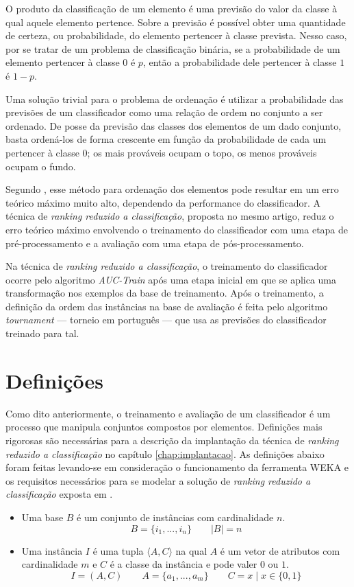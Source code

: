 O produto da classificação de um elemento é uma previsão do valor da classe à qual aquele elemento pertence. Sobre a previsão é possível obter uma quantidade de certeza, ou probabilidade, do elemento pertencer à classe prevista. Nesso caso, por se tratar de um problema de classificação binária, se a probabilidade de um elemento pertencer à classe $0$ é $p$, então a probabilidade dele pertencer à classe $1$ é $1 - p$.

Uma solução trivial para o problema de ordenação é utilizar a probabilidade das previsões de um classificador como uma relação de ordem no conjunto a ser ordenado. De posse da previsão das classes dos elementos de um dado conjunto, basta ordená-los de forma crescente em função da probabilidade de cada um pertencer à classe $0$; os mais prováveis ocupam o topo, os menos prováveis ocupam o fundo.

Segundo \cite{langford08}, esse método para ordenação dos elementos pode resultar em um erro teórico máximo muito alto, dependendo da performance do classificador. A técnica de \emph{ranking reduzido a classificação}, proposta no mesmo artigo, reduz o erro teórico máximo envolvendo o treinamento do classificador com uma etapa de pré-processamento e a avaliação com uma etapa de pós-processamento.

Na técnica de \emph{ranking reduzido a classificação}, o treinamento do classificador ocorre pelo algoritmo \emph{AUC-Train} após uma etapa inicial em que se aplica uma transformação nos exemplos da base de treinamento. Após o treinamento, a definição da ordem das instâncias na base de avaliação é feita pelo algoritmo \emph{tournament} --- torneio em português --- que usa as previsões do classificador treinado para tal.

\section{Definições}

Como dito anteriormente, o treinamento e avaliação de um classificador é um processo que manipula conjuntos compostos por elementos. Definições mais rigorosas são necessárias para a descrição da implantação da técnica de \emph{ranking reduzido a classificação} no capítulo \ref{chap:implantacao}. As definições abaixo foram feitas levando-se em consideração o funcionamento da ferramenta WEKA e os requisitos necessários para se modelar a solução de \emph{ranking reduzido a classificação} exposta em \cite{langford08}.

\begin{itemize}
    \item Uma base $B$ é um conjunto de instâncias com cardinalidade $n$.
    \[B = \{i_1, ..., i_n\} \qquad |B| = n\]

    \item Uma instância $I$ é uma tupla $\langle A, C \rangle$ na qual $A$ é um vetor de atributos com cardinalidade $m$ e $C$ é a classe da instância e pode valer $0$ ou $1$.
    \[I = (A, C) \qquad A = \{a_1, ..., a_m\} \qquad C = x \; | \; x \in \{0, 1\}\]
\end{itemize}

